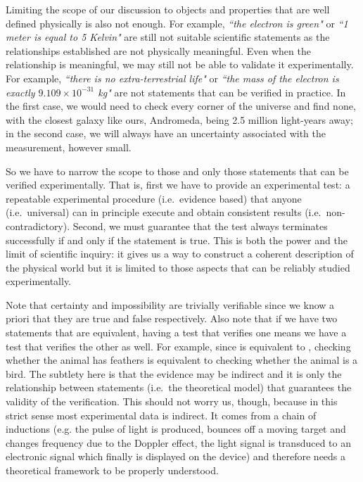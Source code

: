 \documentclass[11pt,letterpaper,fleqn]{memoir} %
\begin{document}
Limiting the scope of our discussion to objects and properties that are well defined physically is also not enough. For example, \emph{``the electron is green"} or \emph{``1 meter is equal to 5 Kelvin"} are still not suitable scientific statements as the relationships established are not physically meaningful. Even when the relationship is meaningful, we may still not be able to validate it experimentally. For example, \emph{``there is no extra-terrestrial life"} or \emph{``the mass of the electron is exactly $9.109 \times 10^{-31}$ kg"} are not statements that can be verified in practice. In the first case, we would need to check every corner of the universe and find none, with the closest galaxy like ours, Andromeda, being 2.5 million light-years away; in the second case, we will always have an uncertainty associated with the measurement, however small.

So we have to narrow the scope to those and only those statements that can be verified experimentally. That is, first we have to provide an experimental test: a repeatable experimental procedure (i.e.~evidence based) that anyone (i.e.~universal) can in principle execute and obtain consistent results (i.e.~non-contradictory). Second, we must guarantee that the test always terminates successfully if and only if the statement is true. This is both the power and the limit of scientific inquiry: it gives us a way to construct a coherent description of the physical world but it is limited to those aspects that can be reliably studied experimentally.

Note that certainty and impossibility are trivially verifiable since we know a priori that they are true and false respectively. Also note that if we have two statements that are equivalent, having a test that verifies one means we have a test that verifies the other as well. For example, since  is equivalent to , checking whether the animal has feathers is equivalent to checking whether the animal is a bird. The subtlety here is that the evidence may be indirect and it is only the relationship between statements (i.e.~the theoretical model) that guarantees the validity of the verification. This should not worry us, though, because in this strict sense most experimental data is indirect. It comes from a chain of inductions (e.g. the pulse of light is produced, bounces off a moving target and changes frequency due to the Doppler effect, the light signal is transduced to an electronic signal which finally is displayed on the device) and therefore needs a theoretical framework to be properly understood.
\end{document}
